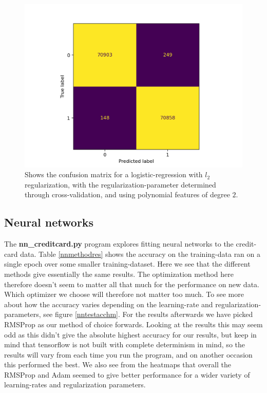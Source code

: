 \documentclass{article}
\begin{document}
\begin{figure}
	\centering
	\includegraphics[scale=0.8]{lr_poly_confusion_mat}
	\caption{Shows the confusion matrix for a logistic-regression with
		$l_2$ regularization, with the regularization-parameter
		determined through cross-validation, and using polynomial
		features of degree $2$.}
	\label{lrpolyconfusionmat}
\end{figure}

\subsection{Neural networks}
The \textbf{nn\_creditcard.py} program explores fitting neural networks to the
credit-card data. Table \ref{nnmethodres} shows the accuracy on the
training-data ran on a single epoch over some smaller training-dataset. Here we
see that the different methods give essentially the same results. The
optimization method here therefore doesn't seem to matter all that much for the
performance on new data. Which optimizer we choose will therefore not matter
too much. To see more about how the accuracy varies depending on the
learning-rate and regularization-parameters, see figure \ref{nntestacchm}. For
the results afterwards we have picked RMSProp as our method of choice forwards.
Looking at the results this may seem odd as this didn't give the absolute
highest accuracy for our results, but keep in mind that tensorflow is not built
with complete determinism in mind, so the results will vary from each time you
run the program, and on another occasion this performed the best. We also see
from the heatmaps that overall the RMSProp and Adam seemed to give better
performance for a wider variety of learning-rates and regularization parameters.
\end{document}
